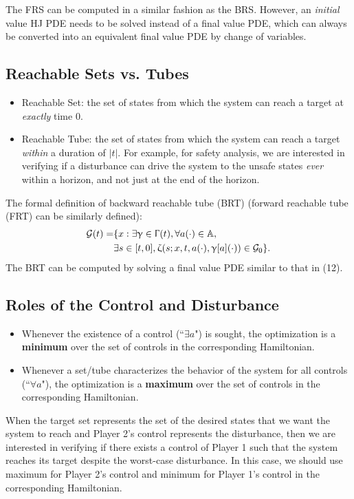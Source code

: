 \documentclass{article}
\begin{document}
The FRS can be computed in a similar fashion as the BRS. However, an \textit{initial} value HJ PDE needs to be solved instead of a final value PDE, which can always be converted into an equivalent final value PDE by change of variables.

\subsection{Reachable Sets vs. Tubes}
\begin{itemize}
    \item Reachable Set: the set of states from which the system can reach a target at \textit{exactly} time 0.
    \item Reachable Tube: the set of states from which the system can reach a target \textit{within} a duration of $|t|$. For example, for safety analysis, we are interested in verifying if a disturbance can drive the system to the unsafe states \textit{ever} within a horizon, and not just at the end of the horizon.
\end{itemize}

The formal definition of backward reachable tube (BRT) (forward reachable tube (FRT) can be similarly defined):
\begin{align}
    \mathcal{G}(t) = & \{ x : \exists \upgamma \in \Upgamma(t), \forall a(\cdot) \in \mathbb{A}, \\
    & \exists s \in [t,0], \upzeta(s;x,t,a(\cdot), \upgamma[a](\cdot)) \in \mathcal{G}_0\}.
\end{align}
The BRT can be computed by solving a final value PDE similar to that in (12).

\subsection{Roles of the Control and Disturbance}
\begin{itemize}
    \item Whenever the existence of a control (``$\exists a$") is sought, the optimization is a \textbf{minimum} over the set of controls in the corresponding Hamiltonian.
    \item Whenever a set/tube characterizes the behavior of the system for all controls (``$\forall a$"), the optimization is a \textbf{maximum} over the set of controls in the corresponding Hamiltonian.
\end{itemize}

When the target set represents the set of the desired states that we want the system to reach and Player 2's control represents the disturbance, then we are interested in verifying if there exists a control of Player 1 such that the system reaches its target despite the worst-case disturbance. In this case, we should use maximum for Player 2's control and minimum for Player 1's control in the corresponding Hamiltonian.
\end{document}

